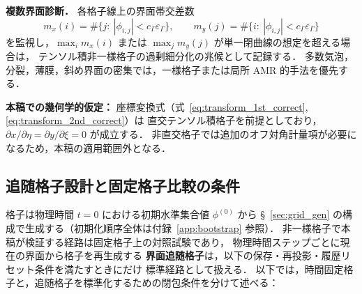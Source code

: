 \noindent\textbf{複数界面診断．}
各格子線上の界面帯交差数
\[
  m_x(i)=\#\{j:\ |\phi_{i,j}|<c_\Gamma\varepsilon_\Gamma\},\qquad
  m_y(j)=\#\{i:\ |\phi_{i,j}|<c_\Gamma\varepsilon_\Gamma\}
\]
を監視し，$\max_i m_x(i)$ または $\max_j m_y(j)$ が単一閉曲線の想定を超える場合は，
テンソル積非一様格子の過剰細分化の兆候として記録する．
多数気泡，分裂，薄膜，斜め界面の密集では，一様格子または局所 AMR 的手法を優先する．

\textbf{本稿での幾何学的仮定：} 座標変換式（式~\eqref{eq:transform_1st_correct}, \eqref{eq:transform_2nd_correct}）は
直交テンソル積格子を前提としており，$\partial x/\partial\eta = \partial y/\partial\xi = 0$ が成立する．
非直交格子では追加のオフ対角計量項が必要になるため，本稿の適用範囲外となる．

\subsection{追随格子設計と固定格子比較の条件}
\label{sec:grid_ale}

格子は物理時間 $t=0$ における初期水準集合値 $\phi^{(0)}$ から
§~\ref{sec:grid_gen} の構成で生成する（初期化順序全体は付録~\ref{app:bootstrap} 参照）．
非一様格子で本稿が検証する経路は固定格子上の対照試験であり，
物理時間ステップごとに現在の界面から格子を再生成する
\textbf{界面追随格子}は，以下の保存・再投影・履歴リセット条件を満たすときにだけ
標準経路として扱える．
以下では，時間固定格子と，追随格子を標準化するための閉包条件を分けて述べる：

